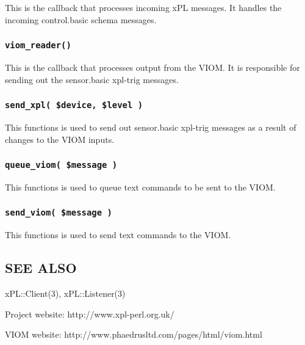 \documentclass[12pt,a4paper]{article}
\begin{document}
This is the callback that processes incoming xPL messages.  It handles
the incoming control.basic schema messages.

\subsubsection*{\texttt{viom\_reader()}\label{xpl-viom_viom_reader_}}


This is the callback that processes output from the VIOM.  It is
responsible for sending out the sensor.basic xpl-trig messages.

\subsubsection*{\texttt{send\_xpl( \$device, \$level )}\label{xpl-viom_send_xpl_device_level_}}


This functions is used to send out sensor.basic xpl-trig messages as a
result of changes to the VIOM inputs.

\subsubsection*{\texttt{queue\_viom( \$message )}\label{xpl-viom_queue_viom_message_}}


This functions is used to queue text commands to be sent to the VIOM.

\subsubsection*{\texttt{send\_viom( \$message )}\label{xpl-viom_send_viom_message_}}


This functions is used to send text commands to the VIOM.

\subsection*{SEE ALSO\label{xpl-viom_SEE_ALSO}}


xPL::Client(3), xPL::Listener(3)



Project website: http://www.xpl-perl.org.uk/



VIOM website: http://www.phaedrusltd.com/pages/html/viom.html
\end{document}
